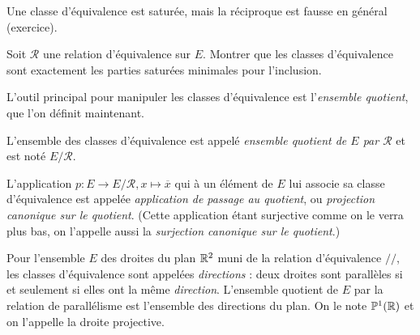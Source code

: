 \begin{exemple}
Une classe d'équivalence est saturée, mais la réciproque est fausse en général (exercice).
\end{exemple}

\begin{exercice}
Soit $\mathcal R$ une relation d'équivalence sur $E$. Montrer que les classes d'équivalence sont exactement les parties saturées minimales pour l'inclusion.
\end{exercice}


L'outil principal pour manipuler les classes d'équivalence est l'\emph{ensemble quotient}, que l'on définit maintenant.

\begin{definition}

L'ensemble des classes d'équivalence est appelé \emph{ensemble quotient de $E$ par $\mathcal R$} et est noté $E/{\mathcal R}$.

L'application $p : E \to E/\mathcal R, x\mapsto \overline{x}$ qui à un élément de $E$ lui associe sa classe d'équivalence est appelée \emph{application de passage au quotient}, ou \emph{projection canonique sur le quotient}. (Cette application étant surjective comme on le verra plus bas, on l'appelle aussi la \emph{surjection canonique sur le quotient}.)
\end{definition}

\begin{exemple}
Pour l'ensemble $E$ des droites du plan $\mathbb{R}^2$ muni de la relation d'équivalence $//$, les classes d'équivalence sont appelées \emph{directions} : deux droites sont parallèles si et seulement si elles ont la même \emph{direction}. L'ensemble quotient de $E$ par la relation de parallélisme est l'ensemble des directions du plan. On le note $\mathbb{P}^1(\mathbb{R})$ et on l'appelle la droite projective.
\end{exemple}

